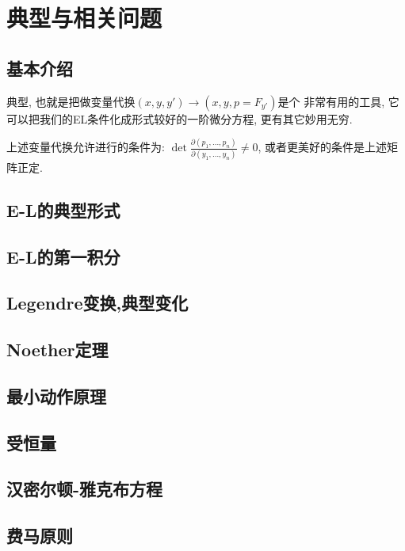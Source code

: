 \section{典型与相关问题}

\subsection{基本介绍}

    典型, 也就是把做变量代换\((x,y,y') \to (x,y,p = F_{y'})\)是个
    非常有用的工具, 它可以把我们的EL条件化成形式较好的一阶微分方程,
    更有其它妙用无穷.

    上述变量代换允许进行的条件为:
    \(\det\frac{\partial(p_1,\dots,p_n)}{\partial(y_1,\dots,y_n)} \ne 0\),
    或者更美好的条件是上述矩阵正定.


\subsection{E-L的典型形式}
\subsection{E-L的第一积分}
\subsection{Legendre变换,典型变化}
\subsection{Noether定理}
\subsection{最小动作原理}
\subsection{受恒量}
\subsection{汉密尔顿-雅克布方程}
\subsection{费马原则}
